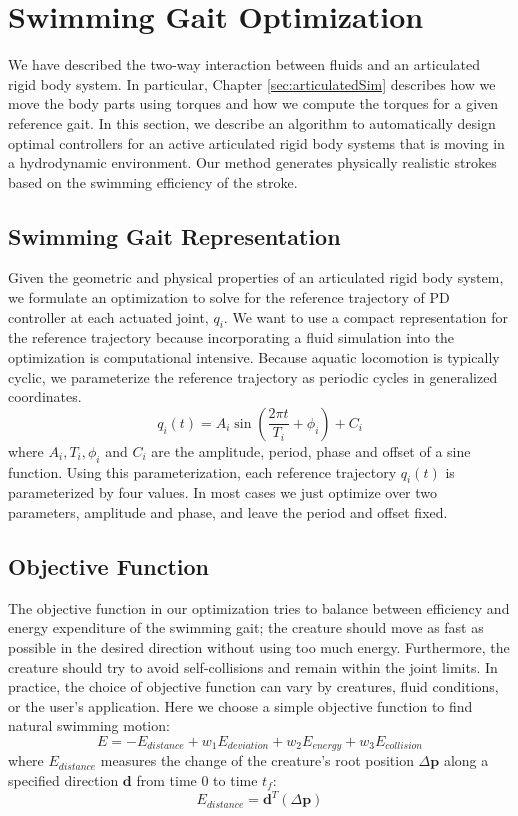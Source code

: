 \section{Swimming Gait Optimization}
\label{sec:optimization}

We have described the two-way interaction between fluids and an articulated rigid body system. In particular, Chapter \ref{sec:articulatedSim} describes how we move the body parts using torques and how we compute the torques for a given reference gait. In this section, we describe an algorithm to automatically design optimal controllers for an active articulated
rigid body systems that is moving in a hydrodynamic environment.  Our
method generates physically realistic strokes based on the swimming
efficiency of the stroke.

\subsection{Swimming Gait Representation}

Given the geometric and physical properties of an articulated rigid body
system, we formulate an optimization to solve for the reference trajectory
of PD controller at each actuated joint, $q_i$.  We want to use a
compact representation for the reference trajectory because
incorporating a fluid simulation into the optimization is computational
intensive. Because aquatic locomotion is typically cyclic, we parameterize
the reference trajectory as periodic cycles in generalized coordinates.
\begin{displaymath}
q_i(t)=A_i\sin(\frac{2\pi t}{T_i}+\phi_i)+C_i
\end{displaymath}
where $A_i, T_i, \phi_i$ and $C_i$ are the amplitude, period, phase and
offset of a sine function. Using this parameterization, each reference
trajectory $q_i(t)$ is parameterized by four values.  In most cases we
just optimize over two parameters, amplitude and phase, and leave the
period and offset fixed.

\subsection{Objective Function}
\label{sec:swimmingObj}
The objective function in our optimization tries to balance between
efficiency and energy expenditure of the swimming gait; the creature
should move as fast as possible in the desired direction without using too
much energy. Furthermore, the creature should try to avoid self-collisions
and remain within the joint limits. In practice, the choice of objective
function can vary by creatures, fluid conditions, or the user's
application. Here we choose a simple objective function to find natural
swimming motion:
\begin{equation}
\label{eq:objFunc}
E=-E_{distance}+w_1E_{deviation}+w_2E_{energy}+w_3E_{collision}
\end{equation}
where $E_{distance}$ measures the change of the creature's root position $\Delta\mathbf{p}$ along a specified direction $\mathbf{d}$ from time 0 to time $t_f$:
\begin{displaymath}
E_{distance}=\mathbf{d}^T(\Delta\mathbf{p})
\end{displaymath}

